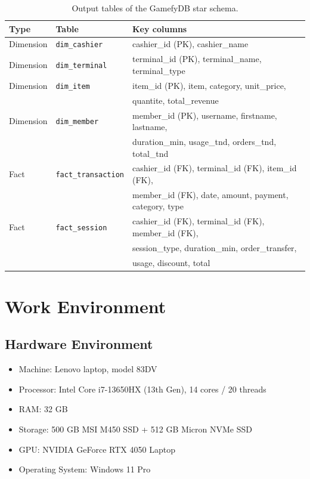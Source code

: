 \documentclass[12pt, a4paper]{report}
\begin{document}
\begin{table}[H]
\centering
\caption{Output tables of the GamefyDB star schema.\label{tab:star_schema}}
\begin{tabular}{lll}
\toprule
\textbf{Type} & \textbf{Table} & \textbf{Key columns} \\
\midrule
Dimension & \texttt{dim\_cashier}  & cashier\_id (PK), cashier\_name \\
Dimension & \texttt{dim\_terminal} & terminal\_id (PK), terminal\_name, terminal\_type \\
Dimension & \texttt{dim\_item}     & item\_id (PK), item, category, unit\_price, \\
          &                        & quantite, total\_revenue \\
Dimension & \texttt{dim\_member}   & member\_id (PK), username, firstname, lastname, \\
          &                        & duration\_min, usage\_tnd, orders\_tnd, total\_tnd \\
\midrule
Fact & \texttt{fact\_transaction} & cashier\_id (FK), terminal\_id (FK), item\_id (FK), \\
     &                            & member\_id (FK), date, amount, payment, category, type \\
Fact & \texttt{fact\_session}     & cashier\_id (FK), terminal\_id (FK), member\_id (FK), \\
     &                            & session\_type, duration\_min, order\_transfer, \\
     &                            & usage, discount, total \\
\bottomrule
\end{tabular}
\end{table}

\section{Work Environment}

\subsection{Hardware Environment}

\begin{itemize}[noitemsep]
  \item Machine: Lenovo laptop, model 83DV
  \item Processor: Intel Core i7-13650HX (13th Gen), 14 cores / 20 threads
  \item RAM: 32 GB
  \item Storage: 500 GB MSI M450 SSD + 512 GB Micron NVMe SSD
  \item GPU: NVIDIA GeForce RTX 4050 Laptop
  \item Operating System: Windows 11 Pro
\end{itemize}
\end{document}
